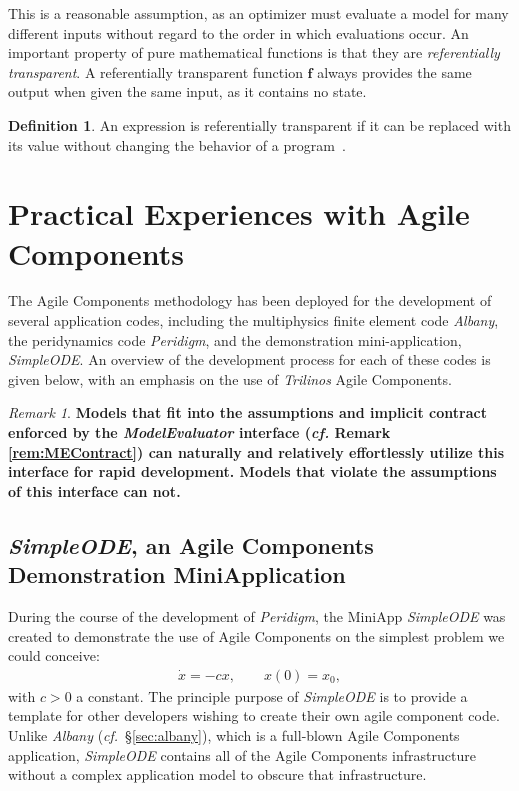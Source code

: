 \documentclass[pdf,ps2pdf,12pt,report]{SANDreport}
\theoremstyle{plain}
\theoremstyle{definition}
\newtheorem{defn}{Definition}[section]
\theoremstyle{remark}
\newtheorem{rem}{Remark}[section]
\numberwithin{equation}{section}
\begin{document}
This is a reasonable assumption, as an optimizer must evaluate a model for many different inputs without regard to the order in which evaluations occur. An important property of pure mathematical functions is that they are \emph{referentially transparent}. A referentially transparent function $\mathbf{f}$ always provides the same output when given the same input, as it contains no state.
\begin{defn} \label{defn:RT}
An expression is referentially transparent if it can be replaced with its value without changing the behavior of a program~\cite{HGVJ:1994:DesignPatterns}.
\end{defn}

\section{Practical Experiences with Agile Components} \label{sec:PracticalACExperience}

The Agile Components methodology has been deployed for the development of several application codes, including the multiphysics finite element code \emph{Albany}, the peridynamics code \emph{Peridigm}, and the demonstration mini-application, \emph{SimpleODE}.  An overview of the development process for each of these codes is given below, with an emphasis on the use of \emph{Trilinos} Agile Components.

\begin{rem}
\textbf{Models that fit into the assumptions and implicit contract enforced by the \emph{ModelEvaluator} interface (\emph{cf.} Remark \ref{rem:MEContract}) can naturally and relatively effortlessly utilize this interface for rapid development. Models that violate the assumptions of this interface can not.}
\end{rem}

\subsection{\emph{SimpleODE}, an Agile Components Demonstration MiniApplication} \label{sec:simpleode}

During the course of the development of \emph{Peridigm}, the MiniApp \emph{SimpleODE} was created to demonstrate the use of Agile Components on the simplest problem we could conceive:
\begin{align}
  \dot{x} = -c x, \qquad x(0)=x_0,
\end{align}
with $c>0$ a constant. The principle purpose of \emph{SimpleODE} is to provide a template for other developers wishing to create their own agile component code. Unlike \emph{Albany} (\emph{cf.}~\S\ref{sec:albany}), which is a full-blown Agile Components application, \emph{SimpleODE} contains all of the Agile Components infrastructure without a complex application model to obscure that infrastructure.
\end{document}
